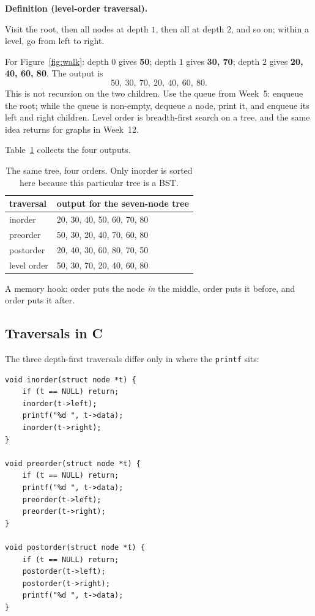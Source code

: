 \documentclass[11pt]{article}
\theoremstyle{definition}
\newenvironment{definitionbox}[1]{%
  \par\noindent\textbf{Definition (#1).}\ \itshape
}{\par\vspace{0.3em}}
\begin{document}
\begin{definitionbox}{level-order traversal}
Visit the root, then all nodes at depth $1$, then all at depth $2$, and so
on; within a level, go from left to right.
\end{definitionbox}

For Figure~\ref{fig:walk}: depth $0$ gives \textbf{50}; depth $1$ gives
\textbf{30, 70}; depth $2$ gives \textbf{20, 40, 60, 80}. The output is
\[
  50,\ 30,\ 70,\ 20,\ 40,\ 60,\ 80.
\]
This is not recursion on the two children. Use the queue from Week~5:
enqueue the root; while the queue is non-empty, dequeue a node, print it, and
enqueue its left and right children. Level order is breadth-first search on a
tree, and the same idea returns for graphs in Week~12.

Table~\ref{tab:orders} collects the four outputs.

\begin{table}[h]
  \centering
  {\footnotesize
  \begin{tabular}{l l}
    \toprule
    \textbf{traversal} & \textbf{output for the seven-node tree} \\
    \midrule
    inorder   & 20, 30, 40, 50, 60, 70, 80 \\
    preorder  & 50, 30, 20, 40, 70, 60, 80 \\
    postorder & 20, 40, 30, 60, 80, 70, 50 \\
    level order & 50, 30, 70, 20, 40, 60, 80 \\
    \bottomrule
  \end{tabular}}
  \caption{The same tree, four orders. Only inorder is sorted here because
    this particular tree is a BST.}
  \label{tab:orders}
\end{table}

A memory hook: order puts the node \emph{in} the middle, order
puts it before, and order puts it after.

\subsection{Traversals in C}

The three depth-first traversals differ only in where the \texttt{printf}
sits:

\begin{verbatim}
void inorder(struct node *t) {
    if (t == NULL) return;
    inorder(t->left);
    printf("%d ", t->data);
    inorder(t->right);
}

void preorder(struct node *t) {
    if (t == NULL) return;
    printf("%d ", t->data);
    preorder(t->left);
    preorder(t->right);
}

void postorder(struct node *t) {
    if (t == NULL) return;
    postorder(t->left);
    postorder(t->right);
    printf("%d ", t->data);
}
\end{verbatim}
\end{document}
